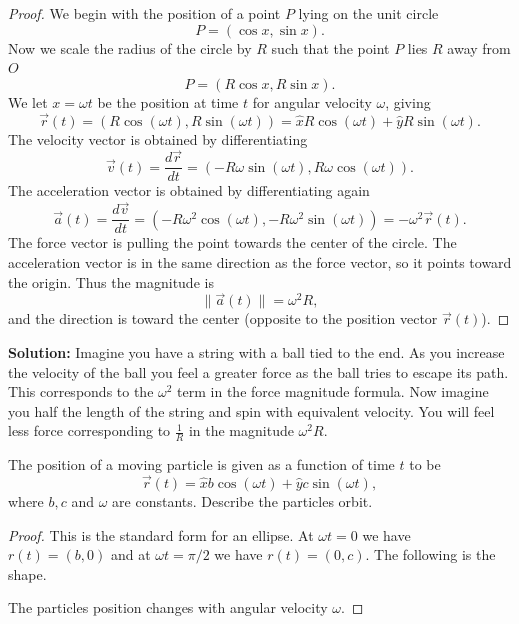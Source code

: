 \begin{proof}
    We begin with the position of a point $P$ lying on the unit circle 
    \[
        P = (\cos x, \sin x).
    \]
    Now we scale the radius of the circle by $R$ such that the point $P$ lies $R$ away from $O$
    \[
        P = (R\cos x, R\sin x).
    \]
    We let $x = \omega t$ be the position at time $t$ for angular velocity $\omega$, giving 
    \[
        \vec{r}(t) = (R\cos(\omega t), R\sin(\omega t)) 
        = \hat{x} R \cos(\omega t) + \hat{y} R \sin(\omega t).
    \]
    The velocity vector is obtained by differentiating
    \[
        \vec{v}(t) = \frac{d\vec{r}}{dt}
        = (-R\omega \sin(\omega t), R\omega \cos(\omega t)).
    \]
    The acceleration vector is obtained by differentiating again
    \[
        \vec{a}(t) = \frac{d\vec{v}}{dt}
        = (-R\omega^2 \cos(\omega t), -R\omega^2 \sin(\omega t))
        = -\omega^2 \vec{r}(t).
    \]
    The force vector is pulling the point towards the center of the circle.
    The acceleration vector is in the same direction as the force vector,
    so it points toward the origin.
    Thus the magnitude is 
    \[
        \|\vec{a}(t)\| = \omega^2 R,
    \]
    and the direction is toward the center (opposite to the position vector $\vec{r}(t)$).
\end{proof}

\textbf{Solution:}
Imagine you have a string with a ball tied to the end.
As you increase the velocity of the ball you feel a greater force as the ball tries to escape its path.
This corresponds to the $\omega^2$ term in the force magnitude formula.
Now imagine you half the length of the string and spin with equivalent velocity.
You will feel less force corresponding to $\frac{1}{R}$ in the magnitude $\omega^2 R$.


\begin{tcolorbox}[title=Problem 11, breakable]
    The position of a moving particle is given as a function 
    of time $t$ to be 
    \[\vec{r}(t) = \hat{x}b \cos(\omega t) + \hat{y} c \sin(\omega t),\]
    where $b, c$ and $\omega$ are constants. Describe the particles orbit.
\end{tcolorbox}

\begin{proof}
    This is the standard form for an ellipse.
    At $\omega t = 0$ we have $r(t) = (b, 0)$
    and at $\omega t = \pi / 2$ we have $r(t) = (0, c)$.
    The following is the shape.
    \begin{center}
    \end{center}
    The particles position changes with angular velocity $\omega$.
\end{proof}


